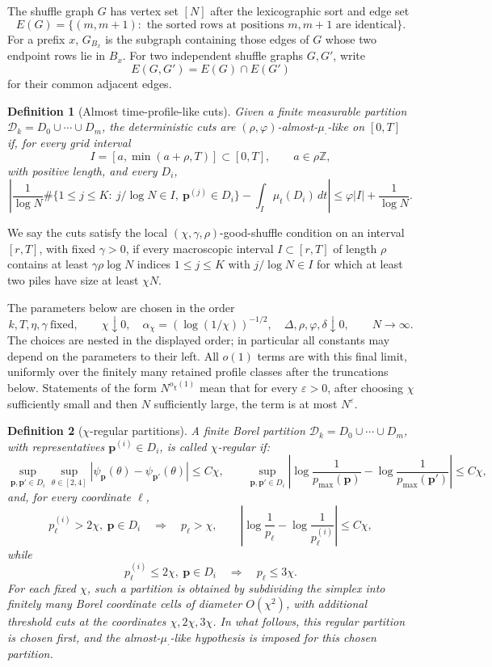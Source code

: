\documentclass[11pt]{article}
\newtheorem{defi}{Definition}
\newcommand{\cD}{\mathcal D}
\newcommand{\bp}{\mathbf p}
\begin{document}
The shuffle graph \(G\) has vertex set \([N]\) after the lexicographic
sort and edge set
\[
    E(G)=\{(m,m+1):\text{ the sorted rows at positions }m,m+1
    \text{ are identical}\}.
\]
For a prefix \(x\), \(G_{B_x}\) is the subgraph containing those edges of
\(G\) whose two endpoint rows lie in \(B_x\). For two independent shuffle
graphs \(G,G'\), write
\[
    E(G,G')=E(G)\cap E(G')
\]
for their common adjacent edges.

\begin{defi}[Almost time-profile-like cuts]
Given a finite measurable partition \(\cD_k=D_0\cup\cdots\cup D_m\), the deterministic cuts are \((\rho,\varphi)\)-almost-\(\mu_\cdot\)-like on \([0,T]\) if, for every grid interval
\[
    I=[a,\min(a+\rho,T)]\subset[0,T],
    \qquad a\in\rho\mathbb Z,
\]
with positive length, and every \(D_i\),
\[
    \left|
    \frac1{\log N}\#\{1\le j\le K:\ j/\log N\in I,\ \bp^{(j)}\in D_i\}
    -\int_I\mu_t(D_i)\,dt
    \right|\le \varphi |I|+\frac{1}{\log N}.
\]
\end{defi}

We say the cuts satisfy the local \((\chi,\gamma,\rho)\)-good-shuffle
condition on an interval \([r,T]\), with fixed \(\gamma>0\), if every
macroscopic interval \(I\subset[r,T]\) of length \(\rho\) contains at
least \(\gamma\rho\log N\) indices \(1\le j\le K\) with
\(j/\log N\in I\) for which at least two piles have size at least
\(\chi N\).

The parameters below are chosen in the order
\[
    k,T,\eta,\gamma\ \text{fixed},\qquad
    \chi\downarrow0,\quad
    \alpha_\chi=(\log(1/\chi))^{-1/2},\quad
    \Delta,\rho,\varphi,\delta\downarrow0,\qquad
    N\to\infty .
\]
The choices are nested in the displayed order; in particular all constants
may depend on the parameters to their left. All \(o(1)\) terms are with
this final limit, uniformly over the finitely many retained profile
classes after the truncations below. Statements of the form
\(N^{o_\chi(1)}\) mean that for every \(\varepsilon>0\), after choosing
\(\chi\) sufficiently small and then \(N\) sufficiently large, the term
is at most \(N^\varepsilon\).

\begin{defi}[\(\chi\)-regular partitions]
A finite Borel partition \(\cD_k=D_0\cup\cdots\cup D_m\), with
representatives \(\bp^{(i)}\in D_i\), is called \(\chi\)-regular if:
\[
    \sup_{\bp,\bp'\in D_i}\sup_{\theta\in[2,4]}
    |\psi_{\bp}(\theta)-\psi_{\bp'}(\theta)|\le C\chi,
    \qquad
    \sup_{\bp,\bp'\in D_i}
    \left|\log\frac1{p_{\max}(\bp)}-\log\frac1{p_{\max}(\bp')}\right|
    \le C\chi,
\]
and, for every coordinate \(\ell\),
\[
    p_\ell^{(i)}>2\chi,\ \bp\in D_i
    \quad\Longrightarrow\quad
    p_\ell>\chi,\qquad
    \left|\log\frac1{p_\ell}-\log\frac1{p_\ell^{(i)}}\right|\le C\chi,
\]
while
\[
    p_\ell^{(i)}\le2\chi,\ \bp\in D_i
    \quad\Longrightarrow\quad p_\ell\le3\chi .
\]
For each fixed \(\chi\), such a partition is obtained by subdividing the
simplex into finitely many Borel coordinate cells of diameter
\(O(\chi^2)\), with additional threshold cuts at the coordinates
\(\chi,2\chi,3\chi\). In what follows, this regular partition is chosen
first, and the almost-\(\mu_\cdot\)-like hypothesis is imposed for this
chosen partition.
\end{defi}
\end{document}
